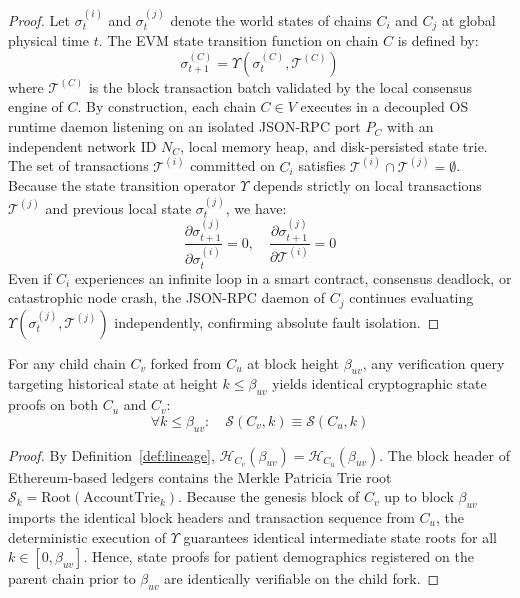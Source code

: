 \begin{proof}
Let $\sigma_t^{(i)}$ and $\sigma_t^{(j)}$ denote the world states of chains $C_i$ and $C_j$ at global physical time $t$. The EVM state transition function on chain $C$ is defined by:
\begin{equation}
\sigma_{t+1}^{(C)} = \Upsilon\left(\sigma_t^{(C)}, \mathcal{T}^{(C)}\right)
\end{equation}
where $\mathcal{T}^{(C)}$ is the block transaction batch validated by the local consensus engine of $C$. By construction, each chain $C \in V$ executes in a decoupled OS runtime daemon listening on an isolated JSON-RPC port $P_C$ with an independent network ID $N_C$, local memory heap, and disk-persisted state trie. The set of transactions $\mathcal{T}^{(i)}$ committed on $C_i$ satisfies $\mathcal{T}^{(i)} \cap \mathcal{T}^{(j)} = \emptyset$. Because the state transition operator $\Upsilon$ depends strictly on local transactions $\mathcal{T}^{(j)}$ and previous local state $\sigma_t^{(j)}$, we have:
\begin{equation}
\frac{\partial \sigma_{t+1}^{(j)}}{\partial \sigma_t^{(i)}} = 0, \quad \frac{\partial \sigma_{t+1}^{(j)}}{\partial \mathcal{T}^{(i)}} = 0
\end{equation}
Even if $C_i$ experiences an infinite loop in a smart contract, consensus deadlock, or catastrophic node crash, the JSON-RPC daemon of $C_j$ continues evaluating $\Upsilon(\sigma_t^{(j)}, \mathcal{T}^{(j)})$ independently, confirming absolute fault isolation.
\end{proof}

\begin{theorem}
\label{thm:consistency}
For any child chain $C_v$ forked from $C_u$ at block height $\beta_{uv}$, any verification query targeting historical state at height $k \le \beta_{uv}$ yields identical cryptographic state proofs on both $C_u$ and $C_v$:
\begin{equation}
\forall k \le \beta_{uv}: \quad \mathcal{S}(C_v, k) \equiv \mathcal{S}(C_u, k)
\end{equation}
\end{theorem}

\begin{proof}
By Definition~\ref{def:lineage}, $\mathcal{H}_{C_v}(\beta_{uv}) = \mathcal{H}_{C_u}(\beta_{uv})$. The block header of Ethereum-based ledgers contains the Merkle Patricia Trie root $\mathcal{S}_k = \text{Root}(\text{AccountTrie}_k)$. Because the genesis block of $C_v$ up to block $\beta_{uv}$ imports the identical block headers and transaction sequence from $C_u$, the deterministic execution of $\Upsilon$ guarantees identical intermediate state roots for all $k \in [0, \beta_{uv}]$. Hence, state proofs for patient demographics registered on the parent chain prior to $\beta_{uv}$ are identically verifiable on the child fork.
\end{proof}

